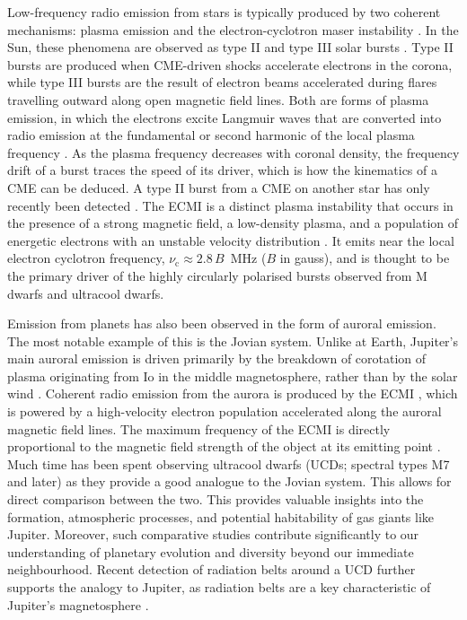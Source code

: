 Low-frequency radio emission from stars is typically produced by two coherent mechanisms: plasma emission and the electron-cyclotron maser instability \citep[ECMI;][]{EMI, dulk_radio_1985}. In the Sun, these phenomena are observed as type II and type III solar bursts \citep{wild_observations_1950}. Type II bursts are produced when CME-driven shocks accelerate electrons in the corona, while type III bursts are the result of electron beams accelerated during flares travelling outward along open magnetic field lines. Both are forms of plasma emission, in which the electrons excite Langmuir waves that are converted into radio emission at the fundamental or second harmonic of the local plasma frequency \citep{dulk_radio_1985}. As the plasma frequency decreases with coronal density, the frequency drift of a burst traces the speed of its driver, which is how the kinematics of a CME can be deduced. A type II burst from a CME on another star has only recently been detected \citep{callingham_radio_2025}. The ECMI is a distinct plasma instability that occurs in the presence of a strong magnetic field, a low-density plasma, and a population of energetic electrons with an unstable velocity distribution \citep{treumann_electron-cyclotron_2006}. It emits near the local electron cyclotron frequency, $\nu_\mathrm{c} \approx 2.8\,B$~MHz ($B$ in gauss), and is thought to be the primary driver of the highly circularly polarised bursts observed from M dwarfs and ultracool dwarfs. \

Emission from planets has also been observed in the form of auroral emission. The most notable example of this is the Jovian system. Unlike at Earth, Jupiter's main auroral emission is driven primarily by the breakdown of corotation of plasma originating from Io in the middle magnetosphere, rather than by the solar wind \citep{cowley_origin_2001}. Coherent radio emission from the aurora is produced by the ECMI \citep{zarka_auroral_1998}, which is powered by a high-velocity electron population accelerated along the auroral magnetic field lines. The maximum frequency of the ECMI is directly proportional to the magnetic field strength of the object at its emitting point \citep{kavanagh_hunting_2023, joe_nature_review}. Much time has been spent observing ultracool dwarfs (UCDs; spectral types M7 and later) as they provide a good analogue to the Jovian system. This allows for direct comparison between the two. This provides valuable insights into the formation, atmospheric processes, and potential habitability of gas giants like Jupiter. Moreover, such comparative studies contribute significantly to our understanding of planetary evolution and diversity beyond our immediate neighbourhood. Recent detection of radiation belts around a UCD further supports the analogy to Jupiter, as radiation belts are a key characteristic of Jupiter's magnetosphere \citep{joe_nature_review}. \

